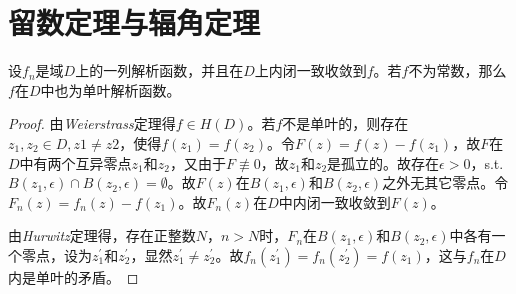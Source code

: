 \chapter{留数定理与辐角定理}



\begin{theorem}
        设${f_n}$是域$D$上的一列解析函数，并且在$D$上内闭一致收敛到$f$。若$f$不为常数，那么$f$在$D$中也为单叶解析函数。
    \end{theorem}
    \begin{proof}
        由\emph{Weierstrass}定理得$f\in H(D)$。若$f$不是单叶的，则存在$z_1,z_2\in D, z1\neq z2$，使得$f(z_1)=f(z_2)$。令$F(z)=f(z)-f(z_1)$，故$F$在$D$中有两个互异零点$z_1$和$z_2$，又由于$F\not \equiv 0$，故$z_1$和$z_2$是孤立的。故存在$\epsilon >0$，s.t.$B(z_1,\epsilon)\cap B(z_2,\epsilon)=\emptyset$。故$F(z)$在$B(z_1,\epsilon)$和$B(z_2,\epsilon)$之外无其它零点。令$F_n(z)=f_n(z)-f(z_1)$。故${F_n(z)}$在$D$中内闭一致收敛到$F(z)$。\par
        由\emph{Hurwitz}定理得，存在正整数$N$，$n>N$时，$F_n$在$B(z_1,\epsilon)$和$B(z_2,\epsilon)$中各有一个零点，设为$z_1^\prime$和$z_2^\prime$，显然$z_1^\prime \neq z_2^\prime $。故$f_n(z_1^\prime)=f_n(z_2^\prime)=f(z_1)$，这与$f_n$在$D$内是单叶的矛盾。
 	\end{proof}
    
    
